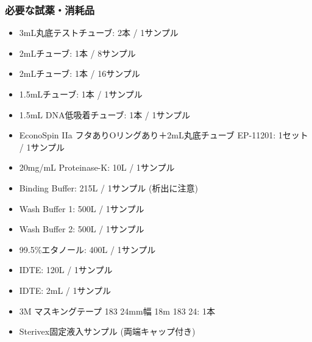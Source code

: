 \documentclass[titlepage,10pt,a4paper,uplatex]{jsbook}
\begin{document}
\subsubsection{必要な試薬・消耗品}
\begin{itemize}
\item 3mL丸底テストチューブ: 2本 / 1サンプル
\item 2mLチューブ: 1本 / 8サンプル
\item 2mLチューブ: 1本 / 16サンプル
\item 1.5mLチューブ: 1本 / 1サンプル
\item 1.5mL DNA低吸着チューブ: 1本 / 1サンプル
\item EconoSpin IIa フタありOリングあり＋2mL丸底チューブ EP-11201: 1セット / 1サンプル
\item 20mg/mL Proteinase-K: 10{\textmu}L / 1サンプル
\item Binding Buffer: 215{\textmu}L / 1サンプル (析出に注意)
\item Wash Buffer 1: 500{\textmu}L / 1サンプル
\item Wash Buffer 2: 500{\textmu}L / 1サンプル
\item 99.5\%エタノール: 400{\textmu}L / 1サンプル
\item IDTE: 120{\textmu}L / 1サンプル
\item IDTE: 2mL / 1サンプル
\item 3M マスキングテープ 183 24mm幅 18m 183 24: 1本
\item Sterivex固定液入サンプル (両端キャップ付き)
\end{itemize}
\end{document}
